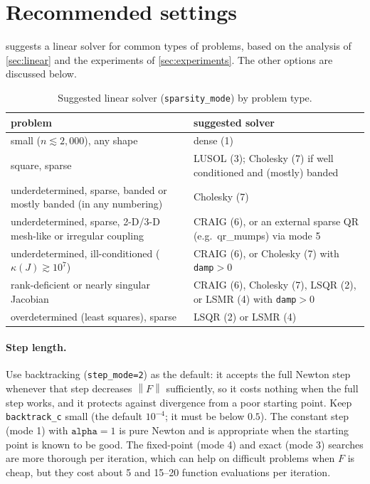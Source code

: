 \documentclass[11pt]{article}
\newcommand{\norm}[1]{\left\lVert #1 \right\rVert}
\newcommand{\code}[1]{\texttt{#1}}
\newcommand{\cond}{\kappa}
\begin{document}
\section{Recommended settings}
\label{sec:recommendations}

 suggests a linear solver for common types of problems, based on the analysis of
\cref{sec:linear} and the experiments of \cref{sec:experiments}. The other options are discussed below.

\begin{table}[htbp]
\centering
\caption{Suggested linear solver (\code{sparsity\_mode}) by problem type.}
\label{tab:recommend}
\small
\begin{tabular}{@{}p{}p{}@{}}
\toprule
problem & suggested solver \\
\midrule
small ($n \lesssim 2{,}000$), any shape & dense (1) \\
square, sparse & LUSOL (3); Cholesky (7) if well conditioned and (mostly) banded \\
underdetermined, sparse, banded or mostly banded (in any numbering) & Cholesky (7) \\
underdetermined, sparse, 2-D/3-D mesh-like or irregular coupling & CRAIG (6), or an external sparse QR (e.g.\ qr\_mumps) via mode 5 \\
underdetermined, ill-conditioned ($\cond(J) \gtrsim 10^7$) & CRAIG (6), or Cholesky (7) with \code{damp}${}>0$ \\
rank-deficient or nearly singular Jacobian & CRAIG (6), Cholesky (7), LSQR (2), or LSMR (4) with \code{damp}${}>0$ \\
overdetermined (least squares), sparse & LSQR (2) or LSMR (4) \\
\bottomrule
\end{tabular}
\end{table}

\paragraph{Step length.} Use backtracking (\code{step\_mode=2}) as the default: it accepts the full Newton
step whenever that step decreases $\norm{F}$ sufficiently, so it costs nothing when the full step works, and
it protects against divergence from a poor starting point. Keep \code{backtrack\_c} small (the default
$10^{-4}$; it must be below $0.5$). The constant step (mode 1) with $\code{alpha} = 1$ is pure Newton and is
appropriate when the starting point is known to be good. The fixed-point (mode 4) and exact (mode 3) searches
are more thorough per iteration, which can help on difficult problems when $F$ is cheap, but they cost about 5
and 15--20 function evaluations per iteration.
\end{document}

